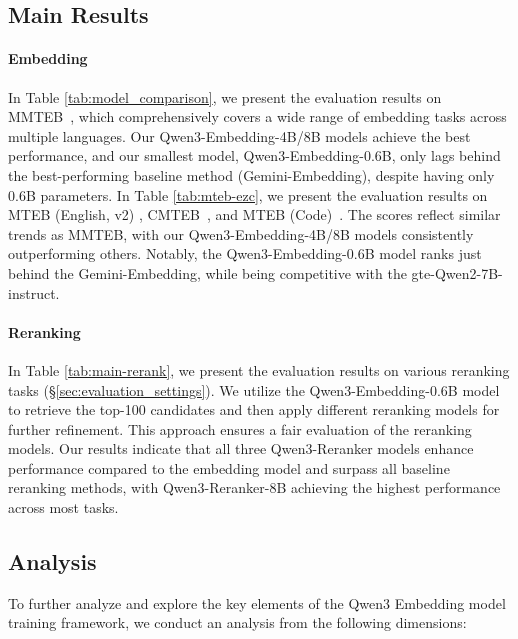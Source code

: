 

\subsection{Main Results}


\paragraph{Embedding} In Table \ref{tab:model_comparison}, we present the evaluation results on MMTEB~\citep{enevoldsen2025mmteb}, which comprehensively covers a wide range of embedding tasks across multiple languages.
Our Qwen3-Embedding-4B/8B models achieve the best performance, and our smallest model, Qwen3-Embedding-0.6B, only lags behind the best-performing baseline method (Gemini-Embedding), despite having only 0.6B parameters.
In Table \ref{tab:mteb-ezc}, we present the evaluation results on MTEB (English, v2) \citep{muennighoff-etal-2023-mteb}, CMTEB~\citep{xiao2024cpack}, and MTEB (Code)~\citep{enevoldsen2025mmteb}.
The scores reflect similar trends as MMTEB, with our Qwen3-Embedding-4B/8B models consistently outperforming others. Notably, the Qwen3-Embedding-0.6B model ranks just behind the Gemini-Embedding, while being competitive with the gte-Qwen2-7B-instruct.


\paragraph{Reranking} In Table \ref{tab:main-rerank}, we present the evaluation results on various reranking tasks (\S\ref{sec:evaluation_settings}). We utilize the Qwen3-Embedding-0.6B model to retrieve the top-100 candidates and then apply different reranking models for further refinement. This approach ensures a fair evaluation of the reranking models. Our results indicate that all three Qwen3-Reranker models enhance performance compared to the embedding model and surpass all baseline reranking methods, with Qwen3-Reranker-8B achieving the highest performance across most tasks.



\subsection{Analysis}

To further analyze and explore the key elements of the Qwen3 Embedding model training framework, we conduct an analysis from the following dimensions:

